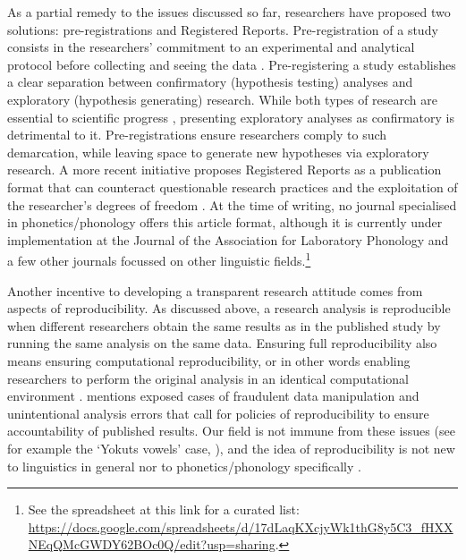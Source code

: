 \documentclass[12pt,a4paper,]{article}
\begin{document}
As a partial remedy to the issues discussed so far, researchers have
proposed two solutions: pre-registrations and Registered Reports.
Pre-registration of a study consists in the researchers' commitment to
an experimental and analytical protocol before collecting and seeing the
data \citep{wagenmakers2012, veer2016}. Pre-registering a study
establishes a clear separation between confirmatory (hypothesis testing)
analyses and exploratory (hypothesis generating) research. While both
types of research are essential to scientific progress
\citep{tukey1980}, presenting exploratory analyses as confirmatory is
detrimental to it. Pre-registrations ensure researchers comply to such
demarcation, while leaving space to generate new hypotheses via
exploratory research. A more recent initiative proposes Registered
Reports as a publication format that can counteract questionable
research practices and the exploitation of the researcher's degrees of
freedom \citep{chambers2015}. At the time of writing, no journal
specialised in phonetics/phonology offers this article format, although
it is currently under implementation at the Journal of the Association
for Laboratory Phonology and a few other journals focussed on other
linguistic
fields.\footnote{See the spreadsheet at this link for a curated list: \url{https://docs.google.com/spreadsheets/d/17dLaqKXcjyWk1thG8y5C3_fHXXNEqQMcGWDY62BOc0Q/edit?usp=sharing}.}

Another incentive to developing a transparent research attitude comes
from aspects of reproducibility. As discussed above, a research analysis
is reproducible when different researchers obtain the same results as in
the published study by running the same analysis on the same data.
Ensuring full reproducibility also means ensuring computational
reproducibility, or in other words enabling researchers to perform the
original analysis in an identical computational environment
\citep{schwab2000, fomel2009}. \citet{peng2009} mentions exposed cases
of fraudulent data manipulation and unintentional analysis errors that
call for policies of reproducibility to ensure accountability of
published results. Our field is not immune from these issues (see for
example the `Yokuts vowels' case,
\citealt{weigel2002, weigel2005, blevins2004}), and the idea of
reproducibility is not new to linguistics in general
\citep{bird2003, thieberger2004, maxwell2005, maxwell2013, cysouw2015,  gawne2017}
nor to phonetics/phonology specifically \citep{abari2012, roettger2019}.
\end{document}
